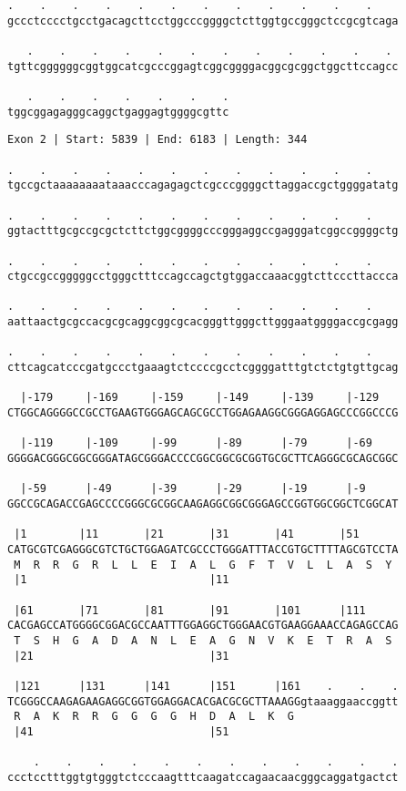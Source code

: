 \documentclass{article}
\begin{document}
\newpage
\begin{Verbatim}[fontfamily=courier]
   .    .    .    .    .    .    .    .    .    .    .    . 
gccctcccctgcctgacagcttcctggcccggggctcttggtgccgggctccgcgtcaga

   .    .    .    .    .    .    .    .    .    .    .    . 
tgttcggggggcggtggcatcgcccggagtcggcggggacggcgcggctggcttccagcc

   .    .    .    .    .    .    .
tggcggagagggcaggctgaggagtggggcgttc
\end{Verbatim}
\newpage
\begin{Verbatim}[fontfamily=courier]
Exon 2 | Start: 5839 | End: 6183 | Length: 344

.    .    .    .    .    .    .    .    .    .    .    .    
tgccgctaaaaaaaataaacccagagagctcgcccggggcttaggaccgctggggatatg

.    .    .    .    .    .    .    .    .    .    .    .    
ggtactttgcgccgcgctcttctggcggggcccgggaggccgagggatcggccggggctg

.    .    .    .    .    .    .    .    .    .    .    .    
ctgccgccgggggcctgggctttccagccagctgtggaccaaacggtcttcccttaccca

.    .    .    .    .    .    .    .    .    .    .    .    
aattaactgcgccacgcgcaggcggcgcacgggttgggcttgggaatggggaccgcgagg

.    .    .    .    .    .    .    .    .    .    .    .    
cttcagcatcccgatgccctgaaagtctccccgcctcggggatttgtctctgtgttgcag

  |-179     |-169     |-159     |-149     |-139     |-129   
CTGGCAGGGGCCGCCTGAAGTGGGAGCAGCGCCTGGAGAAGGCGGGAGGAGCCCGGCCCG

  |-119     |-109     |-99      |-89      |-79      |-69    
GGGGACGGGCGGCGGGATAGCGGGACCCCGGCGGCGCGGTGCGCTTCAGGGCGCAGCGGC

  |-59      |-49      |-39      |-29      |-19      |-9     
GGCCGCAGACCGAGCCCCGGGCGCGGCAAGAGGCGGCGGGAGCCGGTGGCGGCTCGGCAT

 |1        |11       |21       |31       |41       |51      
CATGCGTCGAGGGCGTCTGCTGGAGATCGCCCTGGGATTTACCGTGCTTTTAGCGTCCTA
 M  R  R  G  R  L  L  E  I  A  L  G  F  T  V  L  L  A  S  Y 
 |1                            |11                          

 |61       |71       |81       |91       |101      |111     
CACGAGCCATGGGGCGGACGCCAATTTGGAGGCTGGGAACGTGAAGGAAACCAGAGCCAG
 T  S  H  G  A  D  A  N  L  E  A  G  N  V  K  E  T  R  A  S 
 |21                           |31                          

 |121      |131      |141      |151      |161    .    .    .
TCGGGCCAAGAGAAGAGGCGGTGGAGGACACGACGCGCTTAAAGGgtaaaggaaccggtt
 R  A  K  R  R  G  G  G  G  H  D  A  L  K  G                
 |41                           |51                          

    .    .    .    .    .    .    .    .    .    .    .    .
ccctcctttggtgtgggtctcccaagtttcaagatccagaacaacgggcaggatgactct

\end{Verbatim}
\end{document}
